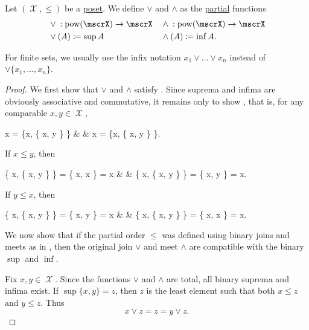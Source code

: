 \begin{definition}\label{def:lattice_operations}
  Let \( (\mscrX, \leq) \) be a \hyperref[def:poset]{poset}. We define  \( \vee \) and  \( \wedge \) as the \hyperref[def:function/partial]{partial} functions
  \begin{align*}
    &{}\vee{}: \pow(\mscrX) \to \mscrX
    &&{}\wedge{}: \pow(\mscrX) \to \mscrX
    \\
    & \vee(A) \coloneqq \sup A
    && \wedge(A) \coloneqq \inf A.
  \end{align*}

  For finite sets, we usually use the infix notation \( x_1 \vee \ldots \vee x_n \) instead of \( \vee \{ x_1, \ldots, x_n \} \).
\end{definition}
\begin{proof}
  We first show that \( \vee \) and \( \wedge \) satisfy . Since suprema and infima are obviously associative and commutative, it remains only to show , that is, for any comparable \( x, y \in \mscrX \),
  \begin{balign*}
    x = \sup \{x, \inf \{ x, y \} \}
     &  &
    x = \inf \{x, \sup \{ x, y \} \}.
  \end{balign*}

  If \( x \leq y \), then
  \begin{balign*}
    \sup \{ x, \inf \{ x, y \} \} = \sup \{ x, x \} = x
     &  &
    \inf \{ x, \sup \{ x, y \} \} = \inf \{ x, y \} = x.
  \end{balign*}

  If \( y \leq x \), then
  \begin{balign*}
    \sup \{ x, \inf \{ x, y \} \} = \sup \{ x, y \} = x
     &  &
    \inf \{ x, \sup \{ x, y \} \} = \inf \{ x, x \} = x.
  \end{balign*}

  We now show that if the partial order \( \leq \) was defined using binary joins and meets as in , then the original join \( \vee \) and meet \( \wedge \) are compatible with the binary \( \sup \) and \( \inf \).

  Fix \( x, y \in \mscrX \). Since the functions \( \vee \) and \( \wedge \) are total, all binary suprema and infima exist. If \( \sup \{ x, y \} = z \), then \( z \) is the least element such that both \( x \leq z \) and \( y \leq z \). Thus
  \begin{equation*}
    x \vee z = z = y \vee z.
  \end{equation*}


\end{proof}
